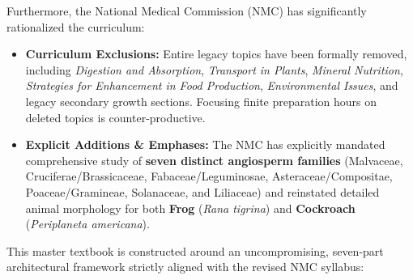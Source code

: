 \documentclass[10pt,twoside,openright]{book}
\begin{document}
Furthermore, the National Medical Commission (NMC) has significantly rationalized the curriculum:
\begin{itemize}
  \item \textbf{Curriculum Exclusions:} Entire legacy topics have been formally removed, including \textit{Digestion and Absorption}, \textit{Transport in Plants}, \textit{Mineral Nutrition}, \textit{Strategies for Enhancement in Food Production}, \textit{Environmental Issues}, and legacy secondary growth sections. Focusing finite preparation hours on deleted topics is counter-productive.
  \item \textbf{Explicit Additions \& Emphases:} The NMC has explicitly mandated comprehensive study of \textbf{seven distinct angiosperm families} (Malvaceae, Cruciferae\slash Brassicaceae, Fabaceae\slash Leguminosae, Asteraceae\slash Compositae, Poaceae\slash Gramineae, Solanaceae, and Liliaceae) and reinstated detailed animal morphology for both \textbf{Frog} (\textit{Rana tigrina}) and \textbf{Cockroach} (\textit{Periplaneta americana}).
\end{itemize}

This master textbook is constructed around an uncompromising, seven-part architectural framework strictly aligned with the revised NMC syllabus:
\end{document}
